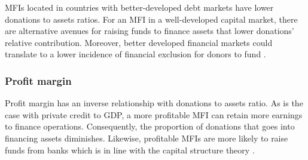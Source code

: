 \documentclass[a4paper, nobind]{templates/ociamthesis}
\begin{document}
MFIs located in countries with better-developed debt markets have lower donations to assets ratios. For an MFI in a well-developed capital market, there are alternative avenues for raising funds to finance assets that lower donations' relative contribution. Moreover, better developed financial markets could translate to a lower incidence of financial exclusion for donors to fund \autocite{marron2013governing}.

\hypertarget{profit-margin-1}{%
\subsubsection{Profit margin}\label{profit-margin-1}}

Profit margin has an inverse relationship with donations to assets ratio. As is the case with private credit to GDP, a more profitable MFI can retain more earnings to finance operations. Consequently, the proportion of donations that goes into financing assets diminishes. Likewise, profitable MFIs are more likely to raise funds from banks which is in line with the capital structure theory \autocite{dorfleitner2017access}.
\end{document}

